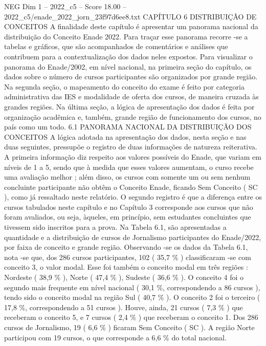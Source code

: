 \begin{textsample}{NEG Dim 1 – 2022\_c5 – Score 18.00 – 2022\_c5/enade\_2022\_jorn\_23f97d6ee8.txt}  \label{ex:f1_neg_418}
CAPÍTULO 6 DISTRIBUIÇÃO DE CONCEITOS A finalidade deste capítulo é apresentar um panorama nacional da distribuição do Conceito Enade 2022.
Para traçar esse panorama recorre -se a tabelas e gráficos, que são acompanhados de comentários e análises que contribuem para a contextualização dos dados neles expostos.
Para visualizar o panorama do Enade/2002, em nível nacional, na primeira seção do capítulo, os dados sobre o número de cursos participantes são organizados por grande região.
Na segunda seção, o mapeamento do conceito do exame é feito por categoria administrativa das IES e modalidade de oferta dos cursos, de maneira cruzada às grandes regiões.
Na última seção, a lógica de apresentação dos dados é feita por organização acadêmica e, também, grande região de funcionamento dos cursos, no país como um todo. 6.1 PANORAMA NACIONAL DA DISTRIBUIÇÃO DOS CONCEITOS A lógica adotada na apresentação dos dados, nesta seção e nas duas seguintes, pressupõe o registro de duas informações de natureza reiterativa.
A primeira informação diz respeito aos valores possíveis do Enade, que variam em níveis de 1 a 5, sendo que à medida que esses valores aumentam, o curso recebe uma avaliação melhor ; além disso, os cursos com somente um ou sem nenhum concluinte participante não obtêm o Conceito Enade, ficando Sem Conceito ( SC ), como já ressaltado neste relatório.
O segundo registro é que a diferença entre os cursos tabulados neste capítulo e no Capítulo 3 corresponde aos cursos que não foram avaliados, ou seja, àqueles, em princípio, sem estudantes concluintes que tivessem sido inscritos para a prova.
Na Tabela 6.1, são apresentadas a quantidade e a distribuição de cursos de Jornalismo participantes do Enade/2022, por faixa de conceito e grande região.
Observando -se os dados da Tabela 6.1, nota -se que, dos 286 cursos participantes, 102 ( 35,7 \% ) classificaram -se com conceito 3, o valor modal.
Esse foi também o conceito modal em três regiões : Nordeste ( 38,9 \% ), Norte ( 47,4 \% ), Sudeste ( 36,6 \% ).
O conceito 4 foi o segundo mais frequente em nível nacional ( 30,1 \%, correspondendo a 86 cursos ), tendo sido o conceito modal na região Sul ( 40,7 \% ).
O conceito 2 foi o terceiro ( 17,8 \%, correspondendo a 51 cursos ).
Houve, ainda, 21 cursos ( 7,3 \% ) que receberam o conceito 5, e 7 cursos ( 2,4 \% ) que receberam o conceito 1.
Dos 286 cursos de Jornalismo, 19 ( 6,6 \% ) ficaram Sem Conceito ( SC ).
A região Norte participou com 19 cursos, o que corresponde a 6,6 \% do total nacional.

\end{textsample}

